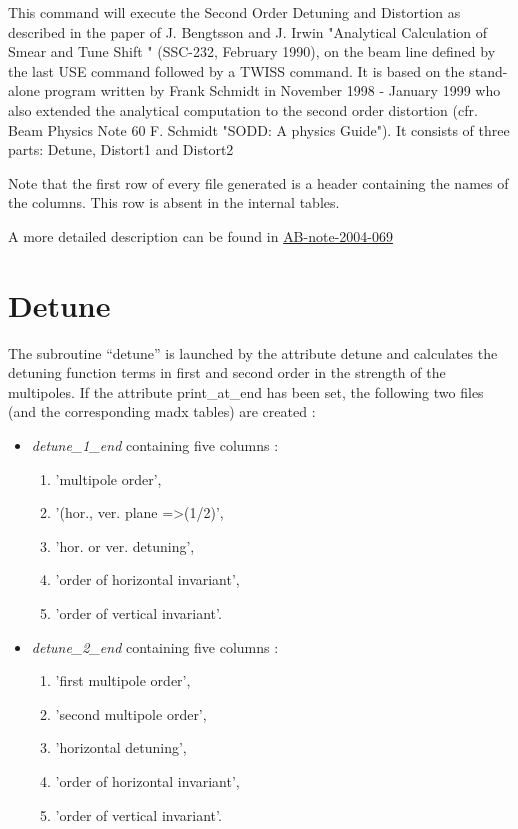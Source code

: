 This command will execute the Second Order Detuning and Distortion as
described in the paper of J. Bengtsson and J. Irwin  "Analytical
Calculation of Smear and Tune Shift " (SSC-232, February 1990), on the
beam line defined by the last USE command followed by a TWISS
command. It is based on the stand-alone program written by Frank Schmidt
in November 1998 - January 1999 who also extended the analytical
computation to the second order distortion (cfr. Beam Physics Note 60
F. Schmidt "SODD: A physics Guide").  It consists of three parts:
Detune, Distort1 and Distort2

Note that the first row of every file generated is a header containing
the names of the columns. This row is absent in the internal tables.   

A more detailed description can be found in
\href{http://cern.ch/madx/doc/ab-note-2004-069}{AB-note-2004-069} 
 
\section{Detune} 
The subroutine ``detune'' is launched by the attribute detune and
calculates the detuning function terms in first and second order in the
strength of the multipoles. If the attribute print\_at\_end has been
set, the following two files  (and the corresponding madx tables) are
created :  

\begin{itemize}
   \item \textit{detune\_1\_end} containing five columns :
     \begin{enumerate}
        \item 'multipole order', 
        \item '(hor., ver. plane =\textgreater (1/2)',
        \item 'hor. or ver. detuning', 
        \item 'order of horizontal invariant', 
        \item 'order of vertical invariant'. 
     \end{enumerate}
   \item \textit{detune\_2\_end}  containing five columns : 
     \begin{enumerate}
        \item 'first multipole order', 
        \item 'second multipole order',  
        \item 'horizontal detuning', 
        \item 'order of horizontal invariant', 
        \item 'order of vertical invariant'.  
     \end{enumerate}
\end{itemize}

